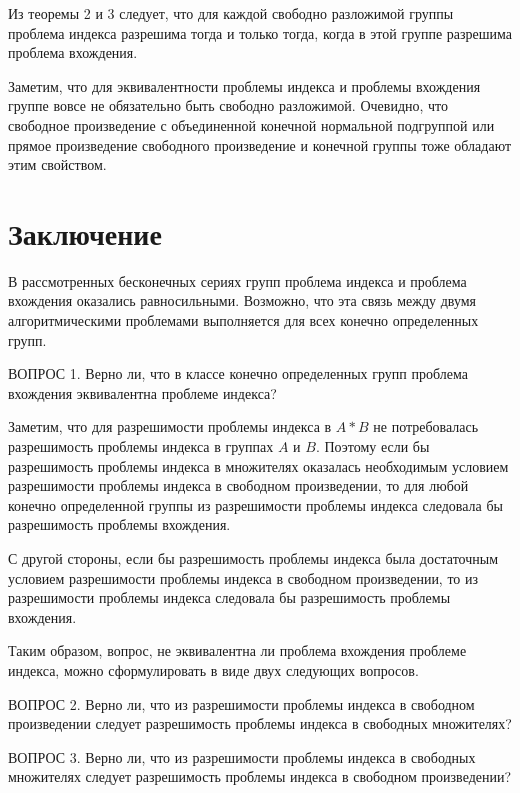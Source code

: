 \documentclass[twoside]{mfitjournal}
\begin{document}
Из теоремы 2 и 3 следует, что для каждой свободно разложимой группы проблема индекса разрешима тогда и только тогда, когда в этой группе разрешима проблема вхождения. 

Заметим, что для эквивалентности проблемы индекса и проблемы вхождения группе вовсе не обязательно быть свободно разложимой. Очевидно, что свободное произведение с объединенной конечной нормальной подгруппой или прямое произведение свободного произведение и конечной группы тоже обладают этим свойством.

\section*{Заключение}

В рассмотренных бесконечных сериях групп проблема индекса и проблема вхождения оказались равносильными.  Возможно, что эта связь между двумя алгоритмическими проблемами выполняется для всех конечно определенных групп.

ВОПРОС 1.  Верно ли, что в классе конечно определенных групп проблема вхождения эквивалентна проблеме индекса?

Заметим, что для разрешимости проблемы индекса в $A \ast B$ не потребовалась разрешимость проблемы индекса в группах $A$ и $B$. Поэтому если бы разрешимость проблемы индекса в множителях оказалась необходимым условием разрешимости проблемы индекса в свободном произведении, то для любой конечно определенной группы из разрешимости проблемы индекса следовала бы разрешимость проблемы вхождения. 

С другой стороны, если бы разрешимость проблемы индекса была достаточным условием разрешимости проблемы индекса в свободном произведении, то из разрешимости проблемы индекса следовала бы разрешимость проблемы вхождения.

Таким образом, вопрос, не эквивалентна ли проблема вхождения проблеме индекса, можно сформулировать в виде двух следующих вопросов. 

ВОПРОС 2. Верно ли, что из разрешимости проблемы индекса в свободном произведении следует разрешимость проблемы индекса в свободных множителях?

ВОПРОС 3. Верно ли, что из разрешимости проблемы индекса в свободных множителях следует разрешимость проблемы индекса в свободном произведении?
\end{document}
